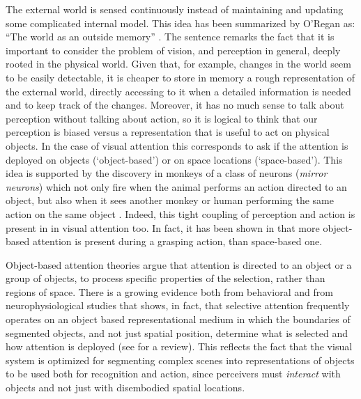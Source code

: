 \documentclass{llncs}
\begin{document}
The external world is sensed
continuously instead of maintaining and updating some
complicated internal model.
This idea has been summarized by O'Regan as:
``The world as an outside memory'' \cite{ORegan92}.
The sentence remarks the fact that it is important
to consider the problem of vision, and perception in general,
deeply rooted in the physical world. Given that, for example,
changes in the world seem to be easily detectable, it
is cheaper to store in memory a rough representation of
the external world, directly accessing to it when a
detailed information is needed and to keep track of the changes.
Moreover, it has no much sense to talk about perception without
talking about action, so it is logical to
think that our perception is biased versus a representation
that is useful to act on physical objects.
In the case of visual attention this corresponds to ask
if the attention is deployed on objects (`object-based') or
on space locations (`space-based').
This idea is supported by the discovery in monkeys of a
class of neurons (\emph{mirror neurons}) which not only
fire when the animal performs an action directed to an
object, but also when it sees another monkey or human performing the
same action on the same object \cite{FadigaFGR00}.
Indeed, this tight coupling of perception and action is present in
in visual attention too. In fact, it has been shown in \cite{FischerH04}
that more object-based attention is present during a grasping action, than
space-based one.


Object-based attention theories
argue that attention is directed to an object or a group
of objects, to process specific properties of the selection,
rather than regions of space. There is a
growing evidence both from behavioral and from
neurophysiological studies that shows, in fact, that
selective attention frequently operates on an object based
representational medium in which the
boundaries of segmented objects, and not just spatial
position, determine what is selected and how attention
is deployed (see \cite{Scholl01} for a review). This reflects the fact
that the visual system is optimized for segmenting
complex scenes into representations of objects to be used both for recognition and
action, since perceivers must \emph{interact} with objects and
not just with disembodied spatial locations.
\end{document}

